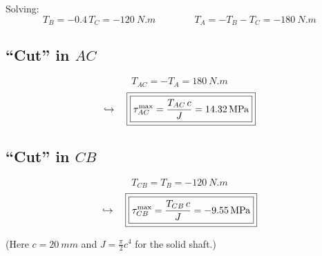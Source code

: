 \documentclass[11pt]{article}
\begin{document}
\noindent
Solving:
\[
  \boxed{T_B = -0.4\,T_C = -\SI{120}{N.m}}
  \qquad\qquad
  \boxed{T_A = -T_B - T_C = -\SI{180}{N.m}}
\]

\subsection*{``Cut'' in $AC$}

\noindent
\begin{minipage}[c]{0.45\textwidth}
\centering
{}
\end{minipage}%
\hfill
\begin{minipage}[c]{0.52\textwidth}
\[
  T_{AC} = -T_A = \SI{180}{N.m}
\]
\[
  \hookrightarrow\quad
  \fbox{\fbox{$\displaystyle \tau_{AC}^{\max} = \frac{T_{AC}\,c}{J} = \SI{14.32}{MPa}$}}
\]
\end{minipage}

\subsection*{``Cut'' in $CB$}

\noindent
\begin{minipage}[c]{0.45\textwidth}
\centering
{}
\end{minipage}%
\hfill
\begin{minipage}[c]{0.52\textwidth}
\[
  T_{CB} = T_B = -\SI{120}{N.m}
\]
\[
  \hookrightarrow\quad
  \fbox{\fbox{$\displaystyle \tau_{CB}^{\max} = \frac{T_{CB}\,c}{J} = -\SI{9.55}{MPa}$}}
\]
\end{minipage}

\bigskip
\noindent
(Here $c = \SI{20}{mm}$ and $J = \frac{\pi}{2}c^4$ for the solid shaft.)
\end{document}

